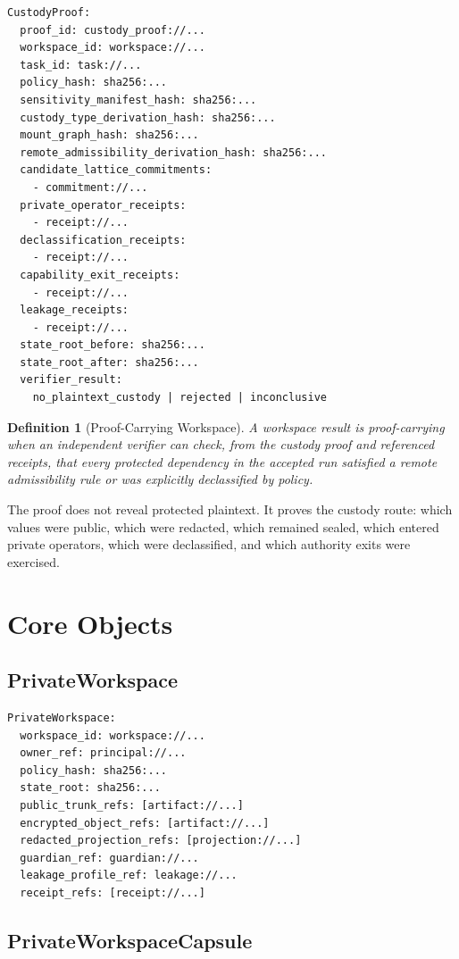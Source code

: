 \documentclass[11pt]{article}
\newtheorem{definition}{Definition}
\begin{document}
\begin{Verbatim}[fontsize=\small]
CustodyProof:
  proof_id: custody_proof://...
  workspace_id: workspace://...
  task_id: task://...
  policy_hash: sha256:...
  sensitivity_manifest_hash: sha256:...
  custody_type_derivation_hash: sha256:...
  mount_graph_hash: sha256:...
  remote_admissibility_derivation_hash: sha256:...
  candidate_lattice_commitments:
    - commitment://...
  private_operator_receipts:
    - receipt://...
  declassification_receipts:
    - receipt://...
  capability_exit_receipts:
    - receipt://...
  leakage_receipts:
    - receipt://...
  state_root_before: sha256:...
  state_root_after: sha256:...
  verifier_result:
    no_plaintext_custody | rejected | inconclusive
\end{Verbatim}

\begin{definition}[Proof-Carrying Workspace]
A workspace result is proof-carrying when an independent verifier can check, from
the custody proof and referenced receipts, that every protected dependency in
the accepted run satisfied a remote admissibility rule or was explicitly
declassified by policy.
\end{definition}

The proof does not reveal protected plaintext. It proves the custody route:
which values were public, which were redacted, which remained sealed, which
entered private operators, which were declassified, and which authority exits
were exercised.

\section{Core Objects}

\subsection{PrivateWorkspace}

\begin{Verbatim}[fontsize=\small]
PrivateWorkspace:
  workspace_id: workspace://...
  owner_ref: principal://...
  policy_hash: sha256:...
  state_root: sha256:...
  public_trunk_refs: [artifact://...]
  encrypted_object_refs: [artifact://...]
  redacted_projection_refs: [projection://...]
  guardian_ref: guardian://...
  leakage_profile_ref: leakage://...
  receipt_refs: [receipt://...]
\end{Verbatim}

\subsection{PrivateWorkspaceCapsule}
\end{document}
